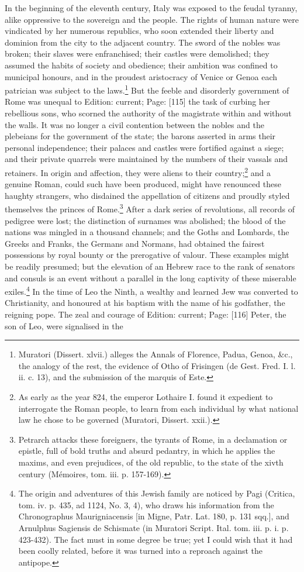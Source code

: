 In the beginning of the eleventh century, Italy was exposed to the feudal tyranny, alike oppressive to the sovereign and the people. The rights of human nature were vindicated by her numerous republics, who soon extended their liberty and dominion from the city to the adjacent country. The sword of the nobles was broken; their slaves were enfranchised; their castles were demolished; they assumed the habits of society and obedience; their ambition was confined to municipal honours, and in the proudest aristocracy of Venice or Genoa each patrician was subject to the laws.\footnote{Muratori (Dissert. xlvii.) alleges the Annals of Florence, Padua, Genoa, \&c., the analogy of the rest, the evidence of Otho of Frisingen (de Gest. Fred. I. l. ii. c. 13), and the submission of the marquis of Este.} But the feeble and disorderly government of Rome was unequal to Edition: current; Page: [115] the task of curbing her rebellious sons, who scorned the authority of the magistrate within and without the walls. It was no longer a civil contention between the nobles and the plebeians for the government of the state; the barons asserted in arms their personal independence; their palaces and castles were fortified against a siege; and their private quarrels were maintained by the numbers of their vassals and retainers. In origin and affection, they were aliens to their country;\footnote{As early as the year 824, the emperor Lothaire I. found it expedient to interrogate the Roman people, to learn from each individual by what national law he chose to be governed (Muratori, Dissert. xxii.).} and a genuine Roman, could such have been produced, might have renounced these haughty strangers, who disdained the appellation of citizens and proudly styled themselves the princes of Rome.\footnote{Petrarch attacks these foreigners, the tyrants of Rome, in a declamation or epistle, full of bold truths and absurd pedantry, in which he applies the maxims, and even prejudices, of the old republic, to the state of the xivth century (Mémoires, tom. iii. p. 157-169).} After a dark series of revolutions, all records of pedigree were lost; the distinction of surnames was abolished; the blood of the nations was mingled in a thousand channels; and the Goths and Lombards, the Greeks and Franks, the Germans and Normans, had obtained the fairest possessions by royal bounty or the prerogative of valour. These examples might be readily presumed; but the elevation of an Hebrew race to the rank of senators and consuls is an event without a parallel in the long captivity of these miserable exiles.\footnote{The origin and adventures of this Jewish family are noticed by Pagi (Critica, tom. iv. p. 435, ad 1124, No. 3, 4), who draws his information from the Chronographus Maurigniacensis [in Migne, Patr. Lat. 180, p. 131 sqq.], and Arnulphus Sagiensis de Schismate (in Muratori Script. Ital. tom. iii. p. i. p. 423-432). The fact must in some degree be true; yet I could wish that it had been coolly related, before it was turned into a reproach against the antipope.} In the time of Leo the Ninth, a wealthy and learned Jew was converted to Christianity, and honoured at his baptism with the name of his godfather, the reigning pope. The zeal and courage of Edition: current; Page: [116] Peter, the son of Leo, were signalised in the 